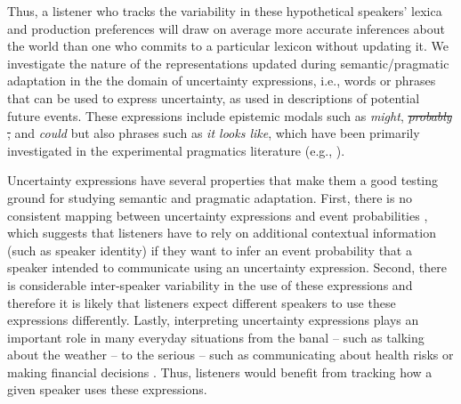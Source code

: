\documentclass[man, floatsintext]{apa6}
\providecommand{\DIFadd}[1]{{\protect\color{blue}\uwave{#1}}} %
\providecommand{\DIFdel}[1]{{\protect\color{red}\sout{#1}}}                      %
\providecommand{\DIFaddbegin}{} %
\providecommand{\DIFaddend}{} %
\providecommand{\DIFdelbegin}{} %
\providecommand{\DIFdelend}{} %
\newcommand{\DIFscaledelfig}{0.5}
\newlength{\DIFdelgraphicswidth} %
\newlength{\DIFdelgraphicsheight} %
\newcommand{\DIFaddincludegraphics}[2][]{{\color{blue}\fbox{\DIFOincludegraphics[#1]{#2}}}} %
\newcommand{\DIFdelincludegraphics}[2][]{%
\sbox{\DIFdelgraphicsbox}{\DIFOincludegraphics[#1]{#2}}%
\settoboxwidth{\DIFdelgraphicswidth}{\DIFdelgraphicsbox} %
\settoboxtotalheight{\DIFdelgraphicsheight}{\DIFdelgraphicsbox} %
\scalebox{\DIFscaledelfig}{%
\parbox[b]{\DIFdelgraphicswidth}{\usebox{\DIFdelgraphicsbox}\\[-\baselineskip] \rule{\DIFdelgraphicswidth}{0em}}\llap{\resizebox{\DIFdelgraphicswidth}{\DIFdelgraphicsheight}{%
\setlength{\unitlength}{\DIFdelgraphicswidth}%
\begin{picture}(1,1)%
\thicklines\linethickness{2pt} %
{\color[rgb]{1,0,0}\put(0,0){\framebox(1,1){}}}%
{\color[rgb]{1,0,0}\put(0,0){\line( 1,1){1}}}%
{\color[rgb]{1,0,0}\put(0,1){\line(1,-1){1}}}%
\end{picture}%
}\hspace*{3pt}}} %
} %
\DeclareRobustCommand{\DIFaddbegin}{\DIFOaddbegin \let\includegraphics\DIFaddincludegraphics} %
\DeclareRobustCommand{\DIFaddend}{\DIFOaddend \let\includegraphics\DIFOincludegraphics} %
\DeclareRobustCommand{\DIFdelbegin}{\DIFOdelbegin \let\includegraphics\DIFdelincludegraphics} %
\DeclareRobustCommand{\DIFdelend}{\DIFOaddend \let\includegraphics\DIFOincludegraphics} %
\begin{document}
Thus, a listener who tracks the variability in these hypothetical speakers' lexica and production preferences will draw on average more accurate inferences about the world than one who commits to a particular lexicon without updating it. We investigate the nature of the representations updated during semantic/pragmatic adaptation in the the domain of uncertainty expressions, i.e., words or phrases that can be used to express uncertainty, as used in descriptions of potential future events. These expressions include epistemic modals such as \textit{might}, 
\DIFdelbegin \textit{\DIFdel{probably}}%
\DIFdel{, }\DIFdelend and \textit{could} \parencite[see, for example,][]{Kratzer1991,Hacquard2011}\DIFaddbegin \DIFadd{, probability operators such as }\textit{\DIFadd{probably}}\DIFadd{, }\DIFaddend but also phrases such as \textit{it looks like}, which have been primarily investigated in the experimental pragmatics literature (e.g., \cite{Kurumada2014,Pogue2018}).

Uncertainty expressions have several properties that make them a good testing ground for studying semantic and pragmatic
adaptation. First, there is no consistent mapping between uncertainty expressions and event probabilities \parencite[e.g.,][]{Clark1990,Pepper1974}, which suggests that listeners have to rely on additional contextual information (such as speaker identity)
if they want to infer an event probability that a speaker intended to communicate using an uncertainty expression. Second, there is considerable inter-speaker variability 
in the use of these expressions \parencite{Wallsten1986} and therefore it is likely that listeners expect different speakers to use these expressions
differently. Lastly, interpreting uncertainty expressions plays an important role in many everyday situations from the banal -- such as talking about the weather -- to the serious -- such as communicating about health risks \parencite{Berry2004, Lipkus2007, Politi2007} or making financial decisions \parencite{Doupnik2003}. 
Thus, listeners would benefit from tracking  how a given speaker uses these expressions. 
\end{document}
